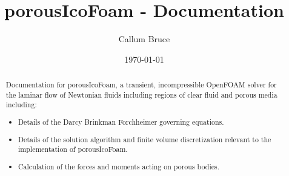 \documentclass[a4paper,11pt]{report}
\begin{document}
\title{porousIcoFoam - Documentation}
\author{Callum Bruce}
\date{\today}
\maketitle

\begin{abstract}
Documentation for porousIcoFoam, a transient, incompressible OpenFOAM solver for the laminar flow of Newtonian fluids including regions of clear fluid and porous media including:
\begin{itemize}
    \item Details of the Darcy Brinkman Forchheimer governing equations.
    \item Details of the solution algorithm and finite volume discretization relevant to the implementation of porousIcoFoam.
    \item Calculation of the forces and moments acting on porous bodies.
\end{itemize}  
\end{abstract}
\end{document}
